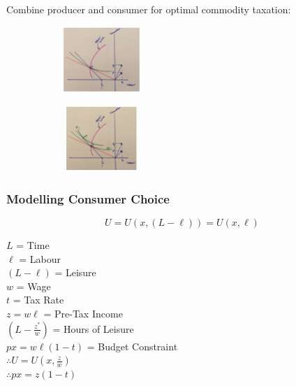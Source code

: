 \documentclass[11pt, english]{article}
\begin{document}
	Combine producer and consumer for optimal commodity taxation:
	
	\begin{figure}[H]      
        \begin{center}                     
                \begin{subfigure}[t]{7cm}  
                \begin{center}             
                        \includegraphics[width=3cm,height=2.5cm]{EC315-IMG/45.png}
                \end{center}               
                \end{subfigure}            
                \begin{subfigure}[t]{7cm}  
                \begin{center}                                                    
                        \includegraphics[width=3cm,height=2.5cm]{EC315-IMG/46.png}
                \end{center}   
                \end{subfigure}
	\end{center}
        \end{figure}

		\subsubsection{Modelling Consumer Choice}

	$$U=U(x,(L-\ell))=U(x,\ell)$$

	$L$ = Time\\
	$\ell$ = Labour\\
	$(L-\ell)$ = Leisure\\
	$w$ = Wage\\
	$t$ = Tax Rate\\
	$z=w\ell$ = Pre-Tax Income\\
	$\left(L-\frac{z^*}{w}\right)$ = Hours of Leisure\\
	$px=w\ell(1-t)$ = Budget Constraint\\
	$\therefore U=U(x,\frac{z}{w})$\\
	$\therefore px=z(1-t)$
\end{document}
